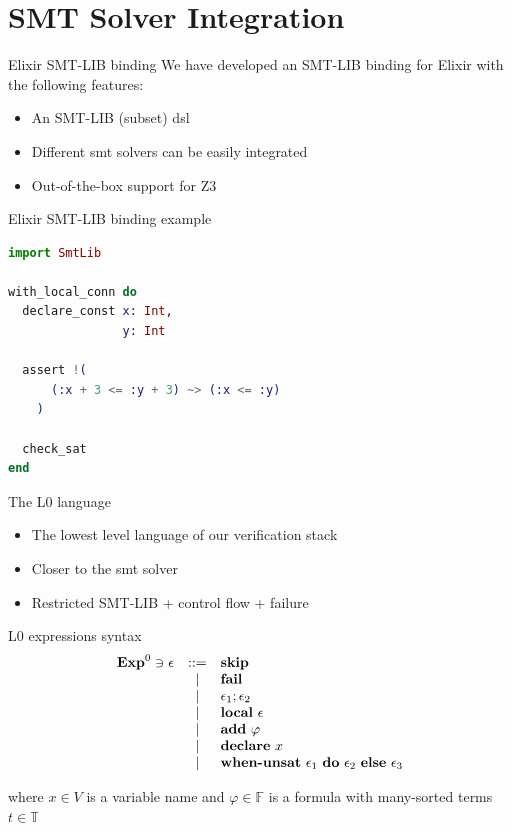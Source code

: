 \documentclass{beamer}
\begin{document}
  \section{SMT Solver Integration}
  \begin{frame}{Elixir SMT-LIB binding}
    We have developed an SMT-LIB binding for Elixir with the following features:

    \begin{itemize}
      \item An SMT-LIB (subset) \gls*{dsl}
      \item Different \acrshort*{smt} solvers can be easily integrated
      \item Out-of-the-box support for Z3
    \end{itemize}
  \end{frame}
  \begin{frame}[fragile]{Elixir SMT-LIB binding example}
    \begin{lstlisting}[language=elixir,numbers=none,frame=none]
import SmtLib

with_local_conn do
  declare_const x: Int,
                y: Int

  assert !(
      (:x + 3 <= :y + 3) ~> (:x <= :y)
    )

  check_sat
end
      \end{lstlisting}
  \end{frame}
  \begin{frame}{The L0 language}
    \begin{itemize}
      \item The lowest level language of our verification stack
      \item Closer to the \acrshort*{smt} solver
      \item Restricted SMT-LIB + control flow + failure
    \end{itemize}
  \end{frame}
  \begin{frame}{L0 expressions syntax}
    \[
      \begin{array}{rcll}
        \mathbf{Exp}^{0} \ni \epsilon & ::= & \textbf{skip} \\
        & | & \textbf{fail} \\
        & | & \epsilon_1;\epsilon_2 \\
        & | & \textbf{local}~\epsilon \\
        & | & \textbf{add}~\varphi \\
        & | & \textbf{declare}~x \\
        & | & \textbf{when-unsat}~\epsilon_1~\textbf{do}~\epsilon_2~\textbf{else}~\epsilon_3 \\
      \end{array}
    \]

    where $x \in V$ is a variable name and $\varphi \in \mathbb{F}$ is a 
    formula with many-sorted terms $t \in \mathbb{T}$
  \end{frame}
\end{document}

